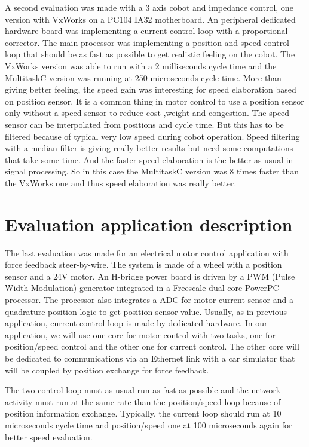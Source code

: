 \documentclass[10pt]{report}
\begin{document}
A second evaluation was made with a 3 axis cobot and impedance control, one version with VxWorks on a PC104
IA32 motherboard. An peripheral dedicated hardware board was implementing a current control loop with a
proportional corrector. The main processor was implementing a position and speed control loop that should
be as fast as possible to get realistic feeling on the cobot. The VxWorks version was able to run with
a 2 milliseconds cycle time and the MultitaskC version was running at 250 microseconds cycle time. More than
giving better feeling, the speed gain was interesting for speed elaboration based on position sensor. It
is a common thing in motor control to use a position sensor only without a speed sensor to reduce cost
,weight and congestion. The speed sensor can be interpolated from positions and cycle time. But this has
to be filtered because of typical very low speed during cobot operation. Speed filtering with a median
filter is giving really better results but need some computations that take some time. And the faster
speed elaboration is the better as usual in signal processing. So in this case the MultitaskC version was
8 times faster than the VxWorks one and thus speed elaboration was really better.

\section{Evaluation application description}

The last evaluation was made for an electrical motor control application with force feedback steer-by-wire.
The system is made of a wheel with a position sensor and a 24V motor. An H-bridge power board is driven
by a PWM (Pulse Width Modulation) generator integrated in a Freescale dual core PowerPC processor. The
processor also integrates a ADC for motor current sensor and a quadrature position logic to get position
sensor value. Usually, as in previous application, current control loop is made by dedicated hardware.
In our application, we will use one core for motor control with two tasks, one for position/speed control
and the other one for current control. The other core will be dedicated to communications via an Ethernet
link with a car simulator that will be coupled by position exchange for force feedback.

The two control loop must as usual run as fast as possible and the network activity must run at the same
rate than the position/speed loop because of position information exchange. Typically, the current loop
should run at 10 microseconds cycle time and position/speed one at 100 microseconds again for better
speed evaluation.
\end{document}

